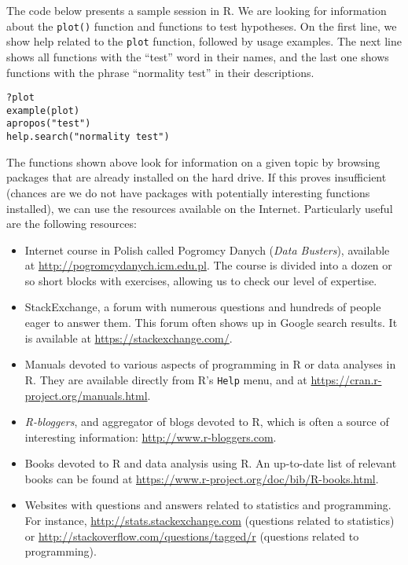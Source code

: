 \documentclass[]{book}
\theoremstyle{definition}
\theoremstyle{definition}
\theoremstyle{definition}
\theoremstyle{remark}
\begin{document}
The code below presents a sample session in R. We are looking for
information about the \texttt{plot()} function and functions to test
hypotheses. On the first line, we show help related to the \texttt{plot}
function, followed by usage examples. The next line shows all functions
with the ``test'' word in their names, and the last one shows functions
with the phrase ``normality test'' in their descriptions.

\begin{verbatim}
?plot
example(plot)
apropos("test")
help.search("normality test")
\end{verbatim}

The functions shown above look for information on a given topic by
browsing packages that are already installed on the hard drive. If this
proves insufficient (chances are we do not have packages with
potentially interesting functions installed), we can use the resources
available on the Internet. Particularly useful are the following
resources:

\begin{itemize}
\item
  Internet course in Polish called Pogromcy Danych (\emph{Data
  Busters}), available at \url{http://pogromcydanych.icm.edu.pl}. The
  course is divided into a dozen or so short blocks with exercises,
  allowing us to check our level of expertise.
\item
  StackExchange, a forum with numerous questions and hundreds of people
  eager to answer them. This forum often shows up in Google search
  results. It is available at \url{https://stackexchange.com/}.
\item
  Manuals devoted to various aspects of programming in R or data
  analyses in R. They are available directly from R's \texttt{Help}
  menu, and at \url{https://cran.r-project.org/manuals.html}.
\item
  \emph{R-bloggers}, and aggregator of blogs devoted to R, which is
  often a source of interesting information:
  \url{http://www.r-bloggers.com}.
\item
  Books devoted to R and data analysis using R. An up-to-date list of
  relevant books can be found at
  \url{https://www.r-project.org/doc/bib/R-books.html}.
\item
  Websites with questions and answers related to statistics and
  programming. For instance, \url{http://stats.stackexchange.com}
  (questions related to statistics) or
  \url{http://stackoverflow.com/questions/tagged/r} (questions related
  to programming).
\end{itemize}
\end{document}

